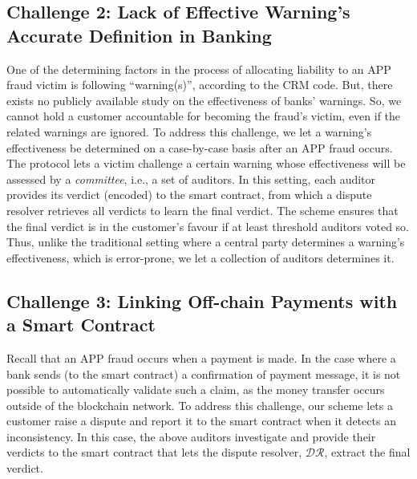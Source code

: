 


\vspace{-3mm}
\subsection{Challenge 2: Lack of Effective Warning's Accurate Definition in Banking}\label{sec::Lack-of-Effective-Warning-Definition}


One of the determining  factors in the process of allocating liability to an APP fraud victim  is following ``warning(s)'', according to the CRM code. But, there exists  no  publicly available study  on the  effectiveness of  banks' warnings. So, we cannot hold a customer accountable for becoming the fraud's victim,  even if the related warnings are ignored.    To address this challenge, we let a warning's effectiveness be determined on a case-by-case basis after an APP fraud occurs. The protocol lets  a victim   challenge a certain warning whose effectiveness will be assessed by a \emph{committee}, i.e., a  set of auditors. In this setting, each auditor provides its verdict  (encoded) to the smart contract, from which a dispute resolver retrieves all verdicts to learn the final verdict. The scheme ensures that the final verdict is  in the customer's favour if at least threshold  auditors voted so. Thus, unlike the traditional setting where a central party determines a warning's effectiveness, which is error-prone, we let a collection of auditors   determines it.



\vspace{-3.5mm}
\subsection{Challenge 3: Linking Off-chain Payments with a Smart Contract}\label{sec::Linking Off-chain-Payments-with-contract}
 Recall that an APP fraud occurs when a payment is made. In the case where a  bank  sends  (to the smart contract) a confirmation of payment message, it is not possible to automatically validate such a claim, as the money  transfer occurs  outside of the blockchain network. To address this challenge, our scheme lets a customer raise a dispute and report it to the smart contract when it detects an inconsistency. In this case, the above auditors investigate and provide their  verdicts to the smart contract that lets the dispute resolver, $\mathcal{DR}$,  extract the final verdict. 


